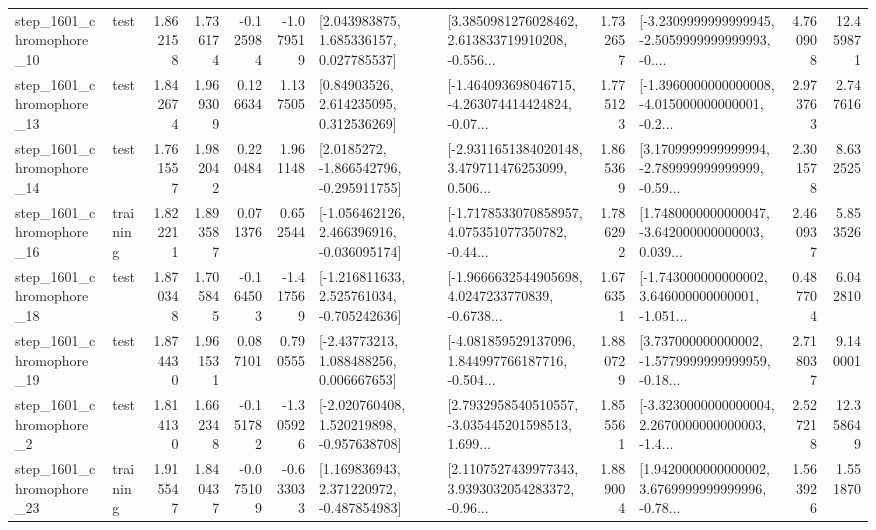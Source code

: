 \begin{tabular}{llrrrrllrlrr}
 step\_1601\_chromophore\_10 &      test &      1.862158 &    1.736174 &     -0.125984 & -1.079519 &     [2.043983875, 1.685336157, 0.027785537] &  [3.3850981276028462, 2.613833719910208, -0.556... &       1.732657 &  [-3.2309999999999945, -2.5059999999999993, -0.... &            4.760908 &         12.459871 \\
 step\_1601\_chromophore\_13 &      test &      1.842674 &    1.969309 &      0.126634 &  1.137505 &      [0.84903526, 2.614235095, 0.312536269] &  [-1.464093698046715, -4.263074414424824, -0.07... &       1.775123 &  [-1.3960000000000008, -4.015000000000001, -0.2... &            2.973763 &          2.747616 \\
 step\_1601\_chromophore\_14 &      test &      1.761557 &    1.982042 &      0.220484 &  1.961148 &     [2.0185272, -1.866542796, -0.295911755] &  [-2.9311651384020148, 3.479711476253099, 0.506... &       1.865369 &  [3.1709999999999994, -2.789999999999999, -0.59... &            2.301578 &          8.632525 \\
 step\_1601\_chromophore\_16 &  training &      1.822211 &    1.893587 &      0.071376 &  0.652544 &   [-1.056462126, 2.466396916, -0.036095174] &  [-1.7178533070858957, 4.075351077350782, -0.44... &       1.786292 &  [1.7480000000000047, -3.642000000000003, 0.039... &            2.460937 &          5.853526 \\
 step\_1601\_chromophore\_18 &      test &      1.870348 &    1.705845 &     -0.164503 & -1.417569 &   [-1.216811633, 2.525761034, -0.705242636] &  [-1.9666632544905698, 4.0247233770839, -0.6738... &       1.676351 &  [-1.743000000000002, 3.646000000000001, -1.051... &            0.487704 &          6.042810 \\
 step\_1601\_chromophore\_19 &      test &      1.874430 &    1.961531 &      0.087101 &  0.790555 &     [-2.43773213, 1.088488256, 0.006667653] &  [-4.081859529137096, 1.844997766187716, -0.504... &       1.880729 &  [3.737000000000002, -1.5779999999999959, -0.18... &            2.718037 &          9.140001 \\
  step\_1601\_chromophore\_2 &      test &      1.814130 &    1.662348 &     -0.151782 & -1.305926 &   [-2.020760408, 1.520219898, -0.957638708] &  [2.7932958540510557, -3.035445201598513, 1.699... &       1.855561 &  [-3.3230000000000004, 2.2670000000000003, -1.4... &            2.527218 &         12.358649 \\
 step\_1601\_chromophore\_23 &  training &      1.915547 &    1.840437 &     -0.075109 & -0.633033 &    [1.169836943, 2.371220972, -0.487854983] &  [2.1107527439977343, 3.9393032054283372, -0.96... &       1.889004 &  [1.9420000000000002, 3.6769999999999996, -0.78... &            1.563926 &          1.551870 \\

\end{tabular}
